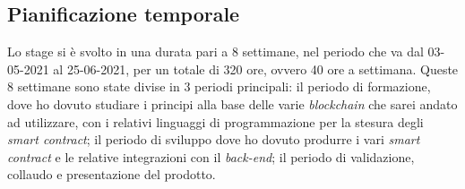 \subsection{Pianificazione temporale}
Lo stage si è svolto in una durata pari a 8 settimane, nel periodo che va dal 03-05-2021 al 25-06-2021, per un totale di 320 ore, ovvero 40 ore a settimana. Queste 8 settimane sono state divise in 3 periodi principali: il periodo di formazione, dove ho dovuto studiare i principi alla base delle varie \textit{blockchain} che sarei andato ad utilizzare, con i relativi linguaggi di programmazione per la stesura degli \textit{smart contract}; il periodo di sviluppo dove ho dovuto produrre i vari \textit{smart contract} e le relative integrazioni con il \textit{back-end}; il periodo di validazione, collaudo e presentazione del prodotto. \\

